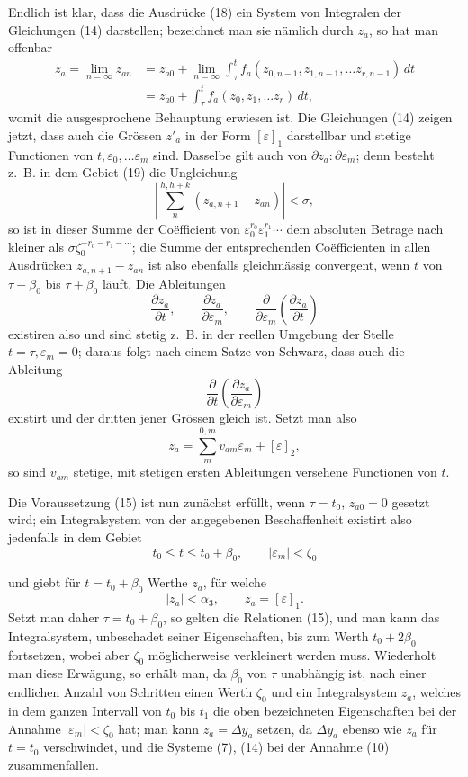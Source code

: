 \documentclass[11pt,a4paper,leqno]{article}
\begin{document}
Endlich ist klar, dass die Ausdrücke (18) ein System von Integralen der
Gleichungen (14) darstellen; bezeichnet man sie nämlich durch $z_a$, so
hat man offenbar
\[
\begin{aligned}
z_a=\lim_{n=\infty}z_{an}
&=z_{a0}+\lim_{n=\infty}\int_\tau^t
f_a(z_{0,n-1},z_{1,n-1},\ldots z_{r,n-1})\,dt\\
&=z_{a0}+\int_\tau^t f_a(z_0,z_1,\ldots z_r)\,dt,
\end{aligned}
\]
womit die ausgesprochene Behauptung erwiesen ist. Die Gleichungen (14)
zeigen jetzt, dass auch die Grössen $z'_a$ in der Form $[\varepsilon]_1$
darstellbar und stetige Functionen von $t,\varepsilon_0,\ldots
\varepsilon_m$ sind. Dasselbe gilt auch von
$\partial z_a:\partial\varepsilon_m$; denn besteht z.~B. in dem Gebiet
(19) die Ungleichung
\[
\left|\sum_n^{h,h+k}(z_{a,n+1}-z_{an})\right|<\sigma,
\]
so ist in dieser Summe der Coëfficient von
$\varepsilon_0^{r_0}\varepsilon_1^{r_1}\cdots$ dem absoluten Betrage
nach kleiner als $\sigma\zeta_0^{-r_0-r_1-\cdots}$; die Summe der
entsprechenden Coëfficienten in allen Ausdrücken $z_{a,n+1}-z_{an}$ ist
also ebenfalls gleichmässig convergent, wenn $t$ von $\tau-\beta_0$ bis
$\tau+\beta_0$ läuft. Die Ableitungen
\[
\frac{\partial z_a}{\partial t},\qquad
\frac{\partial z_a}{\partial\varepsilon_m},\qquad
\frac{\partial}{\partial\varepsilon_m}
\left(\frac{\partial z_a}{\partial t}\right)
\]
existiren also und sind stetig z.~B. in der reellen Umgebung der Stelle
$t=\tau,\varepsilon_m=0$; daraus folgt nach einem Satze von Schwarz,
dass auch die Ableitung
\[
\frac{\partial}{\partial t}
\left(\frac{\partial z_a}{\partial\varepsilon_m}\right)
\]
existirt und der dritten jener Grössen gleich ist. Setzt man also
\[
z_a=\sum_m^{0,m}v_{am}\varepsilon_m+[\varepsilon]_2,
\]
so sind $v_{am}$ stetige, mit stetigen ersten Ableitungen versehene
Functionen von $t$.

Die Voraussetzung (15) ist nun zunächst erfüllt, wenn $\tau=t_0$,
$z_{a0}=0$ gesetzt wird; ein Integralsystem von der angegebenen
Beschaffenheit existirt also jedenfalls in dem Gebiet
\[
t_0\leq t\leq t_0+\beta_0,\qquad |\varepsilon_m|<\zeta_0
\]

und giebt für $t=t_0+\beta_0$ Werthe $z_a$, für welche
\[
|z_a|<\alpha_3,\qquad z_a=[\varepsilon]_1.
\]
Setzt man daher $\tau=t_0+\beta_0$, so gelten die Relationen (15), und
man kann das Integralsystem, unbeschadet seiner Eigenschaften, bis zum
Werth $t_0+2\beta_0$ fortsetzen, wobei aber $\zeta_0$ möglicherweise
verkleinert werden muss. Wiederholt man diese Erwägung, so erhält man,
da $\beta_0$ von $\tau$ unabhängig ist, nach einer endlichen Anzahl von
Schritten einen Werth $\zeta_0$ und ein Integralsystem $z_a$, welches in
dem ganzen Intervall von $t_0$ bis $t_1$ die oben bezeichneten
Eigenschaften bei der Annahme $|\varepsilon_m|<\zeta_0$ hat; man kann
$z_a=\Delta y_a$ setzen, da $\Delta y_a$ ebenso wie $z_a$ für $t=t_0$
verschwindet, und die Systeme (7), (14) bei der Annahme (10)
zusammenfallen.
\end{document}
